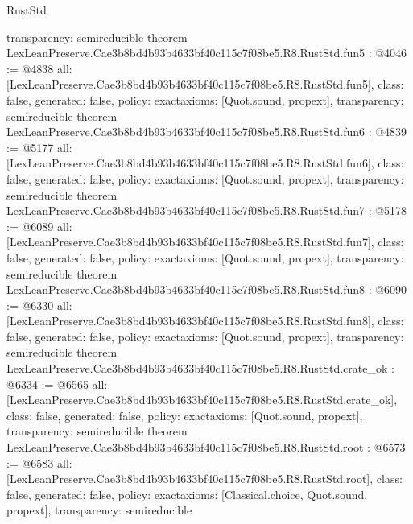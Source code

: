 \begin{lexlean}{RustStd}
\begin{coremodule}
{  transparency: semireducible
}
theorem LexLeanPreserve.Cae3b8bd4b93b4633bf40c115c7f08be5.R8.RustStd.fun5 : @4046 := @4838 {
  all: [LexLeanPreserve.Cae3b8bd4b93b4633bf40c115c7f08be5.R8.RustStd.fun5],
  class: false,
  generated: false,
  policy: exact{axioms: [Quot.sound, propext]},
  transparency: semireducible
}
theorem LexLeanPreserve.Cae3b8bd4b93b4633bf40c115c7f08be5.R8.RustStd.fun6 : @4839 := @5177 {
  all: [LexLeanPreserve.Cae3b8bd4b93b4633bf40c115c7f08be5.R8.RustStd.fun6],
  class: false,
  generated: false,
  policy: exact{axioms: [Quot.sound, propext]},
  transparency: semireducible
}
theorem LexLeanPreserve.Cae3b8bd4b93b4633bf40c115c7f08be5.R8.RustStd.fun7 : @5178 := @6089 {
  all: [LexLeanPreserve.Cae3b8bd4b93b4633bf40c115c7f08be5.R8.RustStd.fun7],
  class: false,
  generated: false,
  policy: exact{axioms: [Quot.sound, propext]},
  transparency: semireducible
}
theorem LexLeanPreserve.Cae3b8bd4b93b4633bf40c115c7f08be5.R8.RustStd.fun8 : @6090 := @6330 {
  all: [LexLeanPreserve.Cae3b8bd4b93b4633bf40c115c7f08be5.R8.RustStd.fun8],
  class: false,
  generated: false,
  policy: exact{axioms: [Quot.sound, propext]},
  transparency: semireducible
}
theorem LexLeanPreserve.Cae3b8bd4b93b4633bf40c115c7f08be5.R8.RustStd.crate_ok : @6334 := @6565 {
  all: [LexLeanPreserve.Cae3b8bd4b93b4633bf40c115c7f08be5.R8.RustStd.crate_ok],
  class: false,
  generated: false,
  policy: exact{axioms: [Quot.sound, propext]},
  transparency: semireducible
}
theorem LexLeanPreserve.Cae3b8bd4b93b4633bf40c115c7f08be5.R8.RustStd.root : @6573 := @6583 {
  all: [LexLeanPreserve.Cae3b8bd4b93b4633bf40c115c7f08be5.R8.RustStd.root],
  class: false,
  generated: false,
  policy: exact{axioms: [Classical.choice, Quot.sound, propext]},
  transparency: semireducible
}


\end{coremodule}
\end{lexlean}
